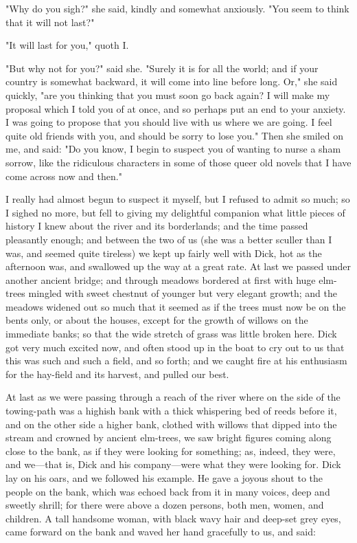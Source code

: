 "Why do you sigh?" she said, kindly and somewhat anxiously. "You seem to
think that it will not last?"

"It will last for you," quoth I.

"But why not for you?" said she. "Surely it is for all the world; and if
your country is somewhat backward, it will come into line before long.
Or," she said quickly, "are you thinking that you must soon go back
again? I will make my proposal which I told you of at once, and so
perhaps put an end to your anxiety. I was going to propose that you
should live with us where we are going. I feel quite old friends with
you, and should be sorry to lose you." Then she smiled on me, and said:
"Do you know, I begin to suspect you of wanting to nurse a sham sorrow,
like the ridiculous characters in some of those queer old novels that I
have come across now and then."

I really had almost begun to suspect it myself, but I refused to admit
so much; so I sighed no more, but fell to giving my delightful companion
what little pieces of history I knew about the river and its
borderlands; and the time passed pleasantly enough; and between the two
of us (she was a better sculler than I was, and seemed quite tireless)
we kept up fairly well with Dick, hot as the afternoon was, and
swallowed up the way at a great rate. At last we passed under another
ancient bridge; and through meadows bordered at first with huge
elm-trees mingled with sweet chestnut of younger but very elegant
growth; and the meadows widened out so much that it seemed as if the
trees must now be on the bents only, or about the houses, except for the
growth of willows on the immediate banks; so that the wide stretch of
grass was little broken here. Dick got very much excited now, and often
stood up in the boat to cry out to us that this was such and such a
field, and so forth; and we caught fire at his enthusiasm for the
hay-field and its harvest, and pulled our best.

At last as we were passing through a reach of the river where on the
side of the towing-path was a highish bank with a thick whispering bed
of reeds before it, and on the other side a higher bank, clothed with
willows that dipped into the stream and crowned by ancient elm-trees, we
saw bright figures coming along close to the bank, as if they were
looking for something; as, indeed, they were, and we---that is, Dick and
his company---were what they were looking for. Dick lay on his oars, and
we followed his example. He gave a joyous shout to the people on the
bank, which was echoed back from it in many voices, deep and sweetly
shrill; for there were above a dozen persons, both men, women, and
children. A tall handsome woman, with black wavy hair and deep-set grey
eyes, came forward on the bank and waved her hand gracefully to us, and
said:

